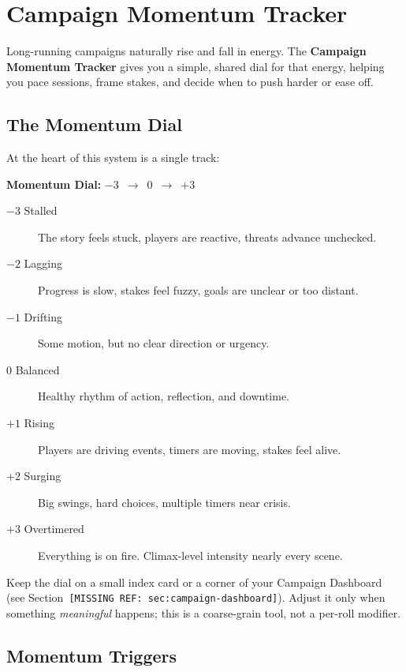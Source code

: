 \documentclass[11pt]{article}
\begin{document}
\section{Campaign Momentum Tracker}
\label{sec:campaign-momentum}

Long-running campaigns naturally rise and fall in energy. The \textbf{Campaign Momentum Tracker} gives you a simple, shared dial for that energy, helping you pace sessions, frame stakes, and decide when to push harder or ease off.

\subsection{The Momentum Dial}

At the heart of this system is a single track:

\begin{center}
\textbf{Momentum Dial:} $-3$ \,$\longrightarrow$\, $0$ \,$\longrightarrow$\, $+3$
\end{center}

\begin{description}
  \item[$-3$ Stalled] The story feels stuck, players are reactive, threats advance unchecked.
  \item[$-2$ Lagging] Progress is slow, stakes feel fuzzy, goals are unclear or too distant.
  \item[$-1$ Drifting] Some motion, but no clear direction or urgency.
  \item[$0$ Balanced] Healthy rhythm of action, reflection, and downtime.
  \item[$+1$ Rising] Players are driving events, timers are moving, stakes feel alive.
  \item[$+2$ Surging] Big swings, hard choices, multiple timers near crisis.
  \item[$+3$ Overtimered] Everything is on fire. Climax-level intensity nearly every scene.
\end{description}

Keep the dial on a small index card or a corner of your Campaign Dashboard (see Section~\texttt{[MISSING REF: sec:campaign-dashboard]}). Adjust it only when something \emph{meaningful} happens; this is a coarse-grain tool, not a per-roll modifier.

\subsection{Momentum Triggers}
\end{document}
